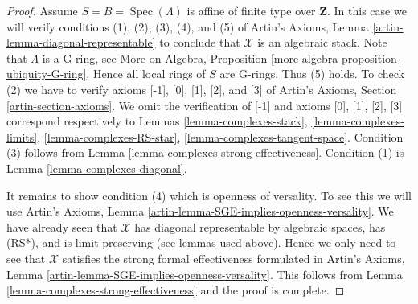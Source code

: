 \documentclass{stacks-project}
\theoremstyle{plain}
\theoremstyle{definition}
\theoremstyle{remark}
\numberwithin{equation}{subsection}
\def\Spec{\mathop{\mathrm{Spec}}}
\begin{document}
\begin{proof}
\medskip\noindent
Assume $S = B = \Spec(\Lambda)$ is affine of finite type over $\mathbf{Z}$.
In this case we will verify conditions (1), (2), (3), (4), and (5) of
Artin's Axioms, Lemma \ref{artin-lemma-diagonal-representable}
to conclude that $\mathcal{X}$ is an algebraic stack.
Note that $\Lambda$ is a G-ring, see
More on Algebra, Proposition \ref{more-algebra-proposition-ubiquity-G-ring}.
Hence all local rings of $S$ are G-rings. Thus (5) holds.
To check (2) we have to verify axioms [-1], [0], [1], [2], and [3]
of Artin's Axioms, Section \ref{artin-section-axioms}.
We omit the verification of [-1] and axioms
[0], [1], [2], [3] correspond respectively to
Lemmas \ref{lemma-complexes-stack},
\ref{lemma-complexes-limits},
\ref{lemma-complexes-RS-star},
\ref{lemma-complexes-tangent-space}.
Condition (3) follows from Lemma \ref{lemma-complexes-strong-effectiveness}.
Condition (1) is Lemma \ref{lemma-complexes-diagonal}.

\medskip\noindent
It remains to show condition (4) which is openness of versality.
To see this we will use
Artin's Axioms, Lemma \ref{artin-lemma-SGE-implies-openness-versality}.
We have already seen that $\mathcal{X}$ has diagonal
representable by algebraic spaces, has (RS*), and is limit preserving
(see lemmas used above).
Hence we only need to see that $\mathcal{X}$ satisfies the strong
formal effectiveness formulated in
Artin's Axioms, Lemma \ref{artin-lemma-SGE-implies-openness-versality}.
This follows from Lemma \ref{lemma-complexes-strong-effectiveness}
and the proof is complete.
\end{proof}















\end{document}
